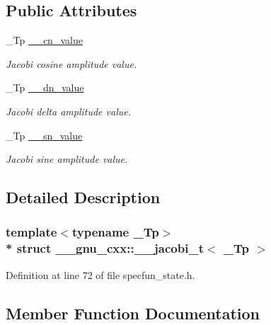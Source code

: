 \subsection*{Public Attributes}
\begin{DoxyCompactItemize}
\item 
\+\_\+\+Tp \hyperlink{struct____gnu__cxx_1_1____jacobi__t_a33e09c9129d7632336c0cad82a77f70d}{\+\_\+\+\_\+cn\+\_\+value}
\begin{DoxyCompactList}\small\item\em Jacobi cosine amplitude value. \end{DoxyCompactList}\item 
\+\_\+\+Tp \hyperlink{struct____gnu__cxx_1_1____jacobi__t_a82f1a7cf2781dc24279d32d489b060ea}{\+\_\+\+\_\+dn\+\_\+value}
\begin{DoxyCompactList}\small\item\em Jacobi delta amplitude value. \end{DoxyCompactList}\item 
\+\_\+\+Tp \hyperlink{struct____gnu__cxx_1_1____jacobi__t_a2fb539e459837b70a1ed4f2b20445d4a}{\+\_\+\+\_\+sn\+\_\+value}
\begin{DoxyCompactList}\small\item\em Jacobi sine amplitude value. \end{DoxyCompactList}\end{DoxyCompactItemize}


\subsection{Detailed Description}
\subsubsection*{template$<$typename \+\_\+\+Tp$>$\\*
struct \+\_\+\+\_\+gnu\+\_\+cxx\+::\+\_\+\+\_\+jacobi\+\_\+t$<$ \+\_\+\+Tp $>$}



Definition at line 72 of file specfun\+\_\+state.\+h.



\subsection{Member Function Documentation}
